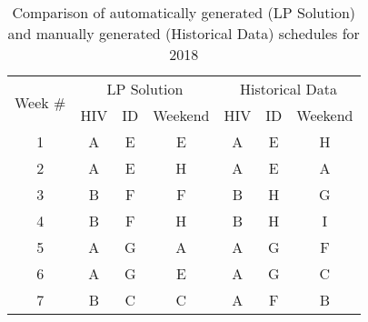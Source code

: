 \begin{table}[htbp]
  \centering
  \caption{Comparison of automatically generated (LP Solution) and manually generated (Historical Data) schedules for 2018}%
  \label{tbl:2018-schedule-comparison}%
	\begin{adjustbox}{scale=0.8}
    \begin{tabular}{c||ccc||ccc}
    \multicolumn{1}{c||}{\multirow{2}[1]{*}{Week \#}} & \multicolumn{3}{c||}{LP Solution} & \multicolumn{3}{c}{Historical Data} \\
          & HIV   & ID    & Weekend & HIV   & ID    & Weekend \\
    \midrule
    \midrule
    1     & \cellcolor[rgb]{ .663,  .816,  .557}A & \cellcolor[rgb]{ .957,  .69,  .518}E & \cellcolor[rgb]{ .957,  .69,  .518}E & \cellcolor[rgb]{ .663,  .816,  .557}A & \cellcolor[rgb]{ .957,  .69,  .518}E & \cellcolor[rgb]{ .459,  .443,  .443}H \\
    2     & \cellcolor[rgb]{ .663,  .816,  .557}A & \cellcolor[rgb]{ .957,  .69,  .518}E & \cellcolor[rgb]{ .459,  .443,  .443}H & \cellcolor[rgb]{ .663,  .816,  .557}A & \cellcolor[rgb]{ .957,  .69,  .518}E & \cellcolor[rgb]{ .663,  .816,  .557}A \\
    3     & \cellcolor[rgb]{ .608,  .761,  .902}B & \cellcolor[rgb]{ .557,  .663,  .859}F & \cellcolor[rgb]{ .557,  .663,  .859}F & \cellcolor[rgb]{ .608,  .761,  .902}B & \cellcolor[rgb]{ .459,  .443,  .443}H & \cellcolor[rgb]{ .518,  .592,  .69}G \\
    4     & \cellcolor[rgb]{ .608,  .761,  .902}B & \cellcolor[rgb]{ .557,  .663,  .859}F & \cellcolor[rgb]{ .459,  .443,  .443}H & \cellcolor[rgb]{ .608,  .761,  .902}B & \cellcolor[rgb]{ .459,  .443,  .443}H & \cellcolor[rgb]{ .251,  .251,  .251}\textcolor[rgb]{ 1,  1,  1}{I} \\
    5     & \cellcolor[rgb]{ .663,  .816,  .557}A & \cellcolor[rgb]{ .518,  .592,  .69}G & \cellcolor[rgb]{ .663,  .816,  .557}A & \cellcolor[rgb]{ .663,  .816,  .557}A & \cellcolor[rgb]{ .518,  .592,  .69}G & \cellcolor[rgb]{ .557,  .663,  .859}F \\
    6     & \cellcolor[rgb]{ .663,  .816,  .557}A & \cellcolor[rgb]{ .518,  .592,  .69}G & \cellcolor[rgb]{ .957,  .69,  .518}E & \cellcolor[rgb]{ .663,  .816,  .557}A & \cellcolor[rgb]{ .518,  .592,  .69}G & \cellcolor[rgb]{ 1,  .851,  .4}C \\
    7     & \cellcolor[rgb]{ .608,  .761,  .902}B & \cellcolor[rgb]{ 1,  .851,  .4}C & \cellcolor[rgb]{ 1,  .851,  .4}C & \cellcolor[rgb]{ .663,  .816,  .557}A & \cellcolor[rgb]{ .557,  .663,  .859}F & \cellcolor[rgb]{ .608,  .761,  .902}B \\

\end{tabular}
\end{adjustbox}
\end{table}
